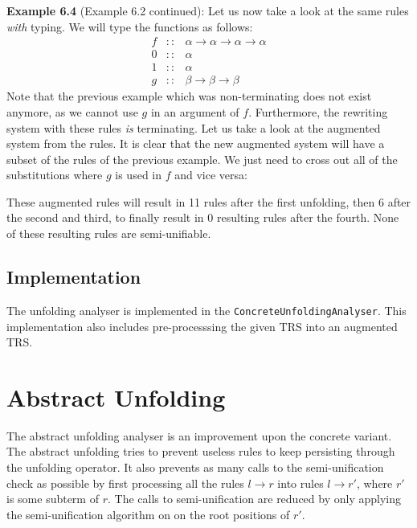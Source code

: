 \textbf{Example 6.4} (Example 6.2 continued): Let us now take a look at the same rules \textit{with} typing. We will type the functions as follows:
\[
\begin{array}{rcl}
    f & :: & \alpha \rightarrow \alpha \rightarrow \alpha \rightarrow \alpha \\
    0 & :: & \alpha \\
    1 & :: & \alpha \\
    g & :: & \beta \rightarrow \beta \rightarrow \beta 
\end{array}
\]
Note that the previous example which was non-terminating does not exist anymore, as we cannot use $g$ in an argument of $f$. Furthermore, the rewriting system with these rules \textit{is} terminating. Let us take a look at the augmented system from the rules. It is clear that the new augmented system will have a subset of the rules of the previous example. We just need to cross out all of the substitutions where $g$ is used in $f$ and vice versa:
\begin{center}
\end{center}
These augmented rules will result in 11 rules after the first unfolding, then 6 after the second and third, to finally result in 0 resulting rules after the fourth. None of these resulting rules are semi-unifiable. 

\subsection{Implementation}
The unfolding analyser is implemented in the \texttt{ConcreteUnfoldingAnalyser}. This implementation also includes pre-processsing the given TRS into an augmented TRS.  

\section{Abstract Unfolding}
The abstract unfolding analyser is an improvement upon the concrete variant. The abstract unfolding tries to prevent useless rules to keep persisting through the unfolding operator. It also prevents as many calls to the semi-unification check as possible by first processing all the rules $l \rightarrow r$ into rules $l \rightarrow r'$, where $r'$ is some subterm of $r$. The calls to semi-unification are reduced by only applying the semi-unification algorithm on on the root positions of $r'$. 

